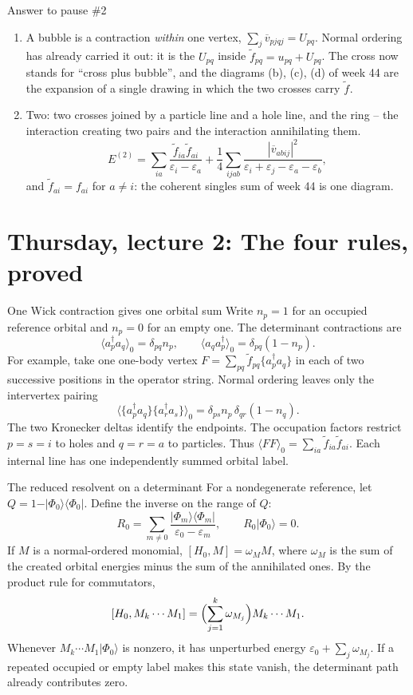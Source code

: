 \documentclass[aspectratio=169,10pt]{beamer}
\newcounter{thinkctr}
\newcommand{\thinka}[1]{%
  \vfill
  \begin{tcolorbox}[enhanced,colback=paleteal,colframe=teal,boxrule=1.2pt,arc=4pt,
    grow to left by=6mm,grow to right by=6mm,
    left=16pt,right=16pt,top=16pt,bottom=18pt,
    fonttitle=\bfseries\Large,fontupper=\large,
    title={Answer to pause \#\thethinkctr}]
  #1
  \end{tcolorbox}
  \vfill}
\newcommand{\ket}[1]{\vert #1\rangle}
\newcommand{\ketbra}[2]{\vert #1\rangle\langle #2\vert}
\newcommand{\av}[1]{\langle #1\rangle_0}
\newcommand{\cre}[1]{a_{#1}^{\dagger}}
\newcommand{\ann}[1]{a_{#1}}
\newcommand{\no}[1]{\bigl\{#1\bigr\}}
\newcommand{\vbar}[4]{\overline v_{#1#2#3#4}}
\newcommand{\ph}{\Phi_0}
\newcommand{\ftil}[1]{\tilde f_{#1}}
\begin{document}
\begin{frame}{Answer to pause \#2}
\thinka{%
\begin{enumerate}
\item A bubble is a contraction \emph{within} one vertex, \(\sum_j\vbar{p}{j}{q}{j}=U_{pq}\). Normal ordering has already carried it out: it is the \(U_{pq}\) inside \(\ftil{pq}=u_{pq}+U_{pq}\). The cross now stands for ``cross plus bubble'', and the diagrams (b), (c), (d) of week 44 are the expansion of a single drawing in which the two crosses carry \(\ftil{}\).
\item Two: two crosses joined by a particle line and a hole line, and the ring -- the interaction creating two pairs and the interaction annihilating them.
\[
E^{(2)}=\sum_{ia}\frac{\ftil{ia}\ftil{ai}}{\varepsilon_i-\varepsilon_a}+\frac14\sum_{ijab}\frac{|\vbar{a}{b}{i}{j}|^2}{\varepsilon_i+\varepsilon_j-\varepsilon_a-\varepsilon_b},
\]
and \(\ftil{ai}=f_{ai}\) for \(a\ne i\): the coherent singles sum of week 44 is one diagram.
\end{enumerate}}
\end{frame}

\section{Thursday, lecture 2: The four rules, proved}

\begin{frame}{One Wick contraction gives one orbital sum}
Write $n_p=1$ for an occupied reference orbital and $n_p=0$ for an empty one. The determinant contractions are
\[
 \av{\cre{p}\ann{q}}=\delta_{pq}n_p,\qquad
 \av{\ann{q}\cre{p}}=\delta_{pq}(1-n_p).
\]
For example, take one one-body vertex $F=\sum_{pq}\ftil{pq}\no{\cre{p}\ann{q}}$ in each of two successive positions in the operator string. Normal ordering leaves only the intervertex pairing
\[
 \av{\no{\cre{p}\ann{q}}\no{\cre{r}\ann{s}}}
 = \delta_{ps}n_p\,\delta_{qr}(1-n_q).
\]
The two Kronecker deltas identify the endpoints. The occupation factors restrict $p=s=i$ to holes and $q=r=a$ to particles. Thus $\av{FF}=\sum_{ia}\ftil{ia}\ftil{ai}$. Each internal line has one independently summed orbital label.
\end{frame}

\begin{frame}{The reduced resolvent on a determinant}
For a nondegenerate reference, let $Q=1-\ketbra{\ph}{\ph}$. Define the inverse on the range of $Q$:
\[
 R_0=\sum_{m\ne0}\frac{\ketbra{\Phi_m}{\Phi_m}}{\varepsilon_0-\varepsilon_m},
 \qquad R_0\ket{\ph}=0.
\]
If $M$ is a normal-ordered monomial, $[H_0,M]=\omega_M M$, where
$\omega_M$ is the sum of the created orbital energies minus the sum of the annihilated ones. By the product rule for commutators,
\[
 [H_0,M_k\cdots M_1]=\Bigl(\sum_{j=1}^k\omega_{M_j}\Bigr)M_k\cdots M_1.
\]
Whenever $M_k\cdots M_1\ket{\ph}$ is nonzero, it has unperturbed energy
$\varepsilon_0+\sum_j\omega_{M_j}$. If a repeated occupied or empty label makes this state vanish, the determinant path already contributes zero.
\end{frame}
\end{document}
